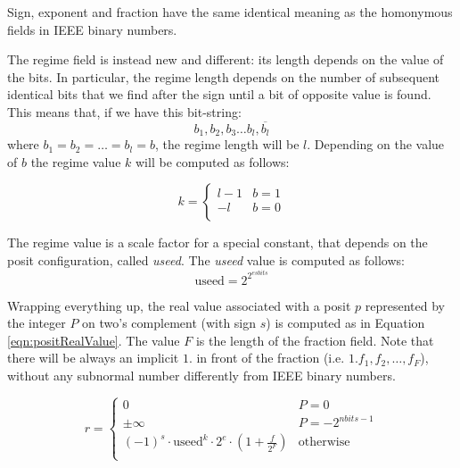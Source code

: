 Sign, exponent and fraction have the same identical meaning as the homonymous fields in IEEE binary numbers. 

The regime field is instead new and different: its length depends on the value of the bits. In particular, the regime length depends on the number of subsequent identical bits that we find after the sign until a bit of opposite value is found. This means that, if we have this bit-string:
\begin{equation}
    b_1, b_2, b_3 \dots b_l, \overline{b_{l}}
\end{equation}
 where $b_1 = b_2 = \dots = b_l = b$, the regime length will be $l$. Depending on the value of $b$ the regime value $k$ will be computed as follows:
 
\begin{equation}\label{eqn:regimeValue}
k = \left\{\begin{matrix}
 l-1& b = 1  \\
 -l & b = 0  \\
\end{matrix}\right.
\end{equation}

The regime value is a scale factor for a special constant, that depends on the posit configuration, called \textit{useed}. The \textit{useed} value is computed as follows:
\begin{equation}\label{eqn:useed}
    \text{useed} = 2^{2^{esbits}}
\end{equation}

Wrapping everything up, the real value associated with a posit $p$ represented by the integer $P$ on two's complement (with sign $s$) is computed as in Equation \eqref{eqn:positRealValue}. The value $F$ is the length of the fraction field. Note that there will be always an implicit $1.$ in front of the fraction (i.e. $1.f_1,f_2, \dots, f_F$), without any subnormal number differently from IEEE binary numbers.

\begin{equation}\label{eqn:positRealValue}
 r =   \left\{\begin{matrix}
0 & P = 0  \\
\pm \infty & P = -2^{nbits-1}  \\
(-1)^s \cdot \text{useed}^{k} \cdot 2^e \cdot \left ( 1+ \frac{f}{2^F} \right) &  \text{otherwise} \\
\end{matrix}\right.
\end{equation}


